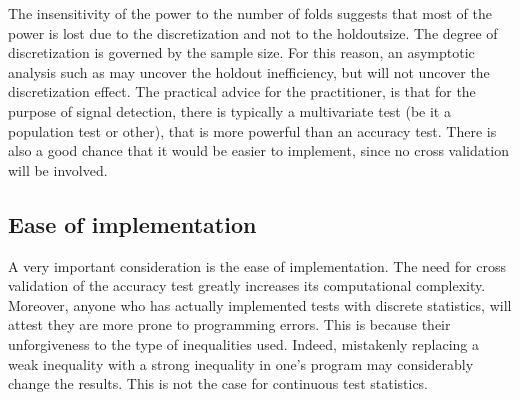 \documentclass[12pt,a4paper]{article}
\theoremstyle{definition}
\begin{document}
The insensitivity of the power to the number of folds suggests that most of the power is lost due to the discretization and not to the holdoutsize. 
The degree of discretization is governed by the sample size. 
For this reason, an asymptotic analysis such as \cite{ramdas_classification_2016} may uncover the holdout inefficiency, but will not uncover the discretization effect. 
The practical advice for the practitioner, is that for the purpose of signal detection, there is typically a multivariate test (be it a population test or other), that is more powerful than an accuracy test. 
There is also a good chance that it would be easier to implement, since no cross validation will be involved. 



\subsection{Ease of implementation}
A very important consideration is the ease of implementation. 
The need for cross validation of the accuracy test greatly increases its computational complexity. 
Moreover, anyone who has actually implemented tests with discrete statistics, will attest they are more prone to programming errors. 
This is because their unforgiveness to the type of inequalities used. 
Indeed, mistakenly replacing a weak inequality with a strong inequality in one's program may considerably change the results. 
This is not the case for continuous test statistics. 
\end{document}
